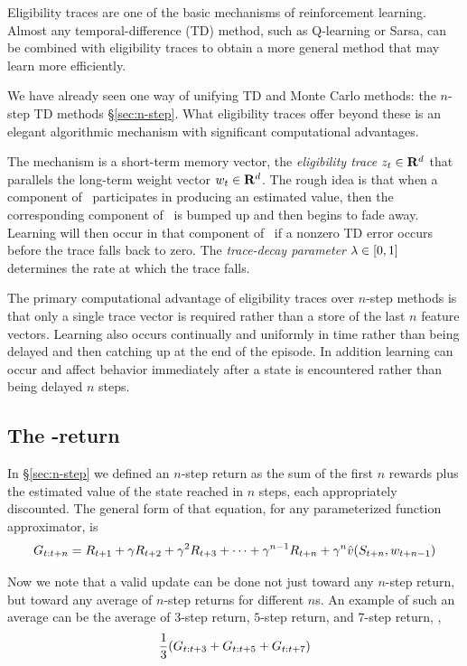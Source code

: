 Eligibility traces are one of the basic mechanisms of reinforcement learning.
Almost any temporal-difference (TD) method,
such as Q-learning or Sarsa,
can be combined with eligibility traces to obtain a more general method that may learn more efficiently.

We have already seen one way of unifying TD and Monte Carlo methods:
the $n$-step TD methods \S\ref{sec:n-step}.
What eligibility traces offer beyond these is an elegant algorithmic mechanism
with significant computational advantages.

The mechanism is a short-term memory vector,
the \emph{eligibility trace} $z_{t} \in \mathbf{R}^d$
that parallels the long-term weight vector $w_{t} \in \mathbf{R}^d$.
The rough idea is that when a component of \ participates in producing an estimated value,
then the corresponding component of \ is bumped up and then begins to fade away.
Learning will then occur in that component of \
if a nonzero TD error occurs before the trace falls back to zero.
The \emph{trace-decay parameter} $\lambda\in[0,1]$
determines the rate at which the trace falls.

The primary computational advantage of eligibility traces over $n$-step methods
is that only a single trace vector is required
rather than a store of the last $n$ feature vectors.
Learning also occurs continually and uniformly in time
rather than being delayed and then catching up at the end of the episode.
In addition
learning can occur and affect behavior
immediately after a state is encountered rather than being delayed $n$ steps.


\subsection{The \tdparam-return}

In \S\ref{sec:n-step} we defined an $n$-step return
as the sum of the first $n$ rewards plus the estimated value of the state reached in $n$ steps,
each appropriately discounted.
The general form of that equation,
for any parameterized function approximator, is
\begin{equation}
\label{eq:nstep-return}
G_{{t}:{t+n}}
=
R_{t+1} + \gamma R_{t+2} + \gamma^2 R_{t+3} + \cdots + \gamma^{n-1} R_{t+n}
+ \gamma^n \hat{v}(S_{t+n}, w_{t+n-1})
\end{equation}

Now we note that a valid update can be done not just toward any $n$-step return,
but toward any average of $n$-step returns for different $n$s.
An example of such an average can be
the average of $3$-step return, $5$-step return, and $7$-step return,
\ie,
\begin{equation}
\frac{1}{3}(
G_{{t}:{t+3}}
+G_{{t}:{t+5}}
+G_{{t}:{t+7}}
)
\end{equation}

